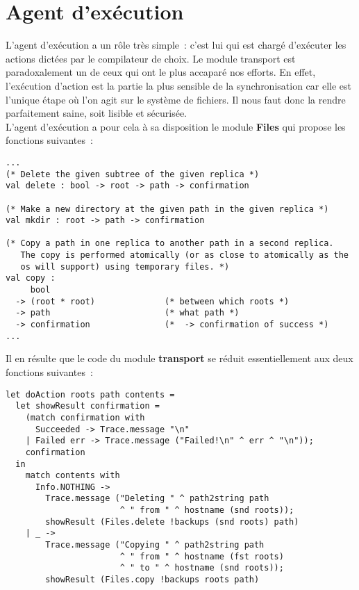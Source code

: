 \documentclass[11pt]{report}
\newcommand{\modu}[1]{\textbf{#1}}
\begin{document}
{\section{Agent d'ex\'ecution}
L'agent d'ex\'ecution a un r\^ole tr\`es simple~: c'est lui qui est charg\'e 
d'ex\'ecuter les actions dict\'ees par le compilateur de choix. Le module
transport est paradoxalement un de ceux qui ont le plus accapar\'e nos 
efforts. En effet, l'ex\'ecution d'action est la partie la plus sensible de la
synchronisation car elle est l'unique \'etape o\`u l'on agit sur le syst\`eme
de fichiers. Il nous faut donc la rendre parfaitement saine, soit lisible et
s\'ecuris\'ee.\\
L'agent d'ex\'ecution a pour cela \`a sa disposition le module \modu{Files}
qui propose les fonctions suivantes~:
\begin{verbatim}
...
(* Delete the given subtree of the given replica *)
val delete : bool -> root -> path -> confirmation

(* Make a new directory at the given path in the given replica *)
val mkdir : root -> path -> confirmation

(* Copy a path in one replica to another path in a second replica.
   The copy is performed atomically (or as close to atomically as the
   os will support) using temporary files. *)
val copy :
     bool                
  -> (root * root)              (* between which roots *)
  -> path                       (* what path *)
  -> confirmation               (*  -> confirmation of success *)
...
\end{verbatim}
Il en r\'esulte que le code du module \modu{transport} se r\'eduit
essentiellement aux deux fonctions suivantes~:
\begin{verbatim}
let doAction roots path contents = 
  let showResult confirmation =
    (match confirmation with
      Succeeded -> Trace.message "\n"
    | Failed err -> Trace.message ("Failed!\n" ^ err ^ "\n"));
    confirmation
  in
    match contents with
      Info.NOTHING ->
        Trace.message ("Deleting " ^ path2string path
                       ^ " from " ^ hostname (snd roots));
        showResult (Files.delete !backups (snd roots) path)
    | _ ->
        Trace.message ("Copying " ^ path2string path
                       ^ " from " ^ hostname (fst roots)
                       ^ " to " ^ hostname (snd roots));
        showResult (Files.copy !backups roots path)


\end{verbatim}}
\end{document}
